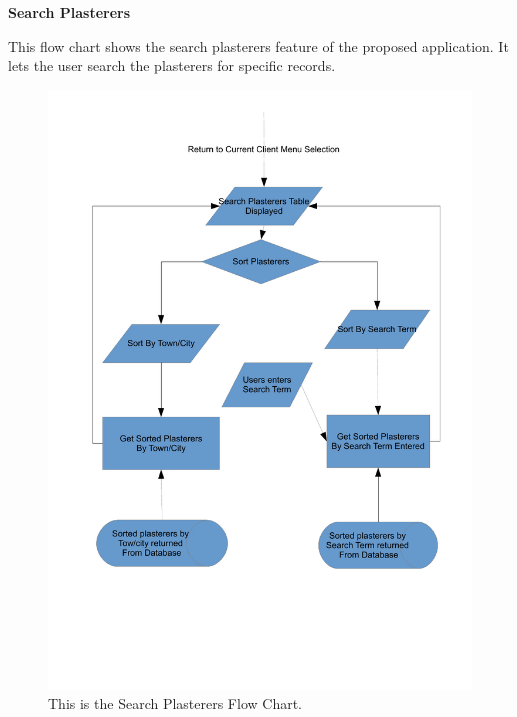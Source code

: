 \pagebreak
\textbf{Search Plasterers}
\begin{flushleft}
This flow chart shows the search plasterers feature of the proposed application. It lets the user search the plasterers for specific records.
\end{flushleft}
\begin{figure}[H]
\includegraphics[scale=0.5]{./Design/images/FlowChartSearchPlasterers.pdf}
    \caption{This is the Search Plasterers Flow Chart.} 
\label{fig:FlowChartSearchPlasterers}
\end{figure}



